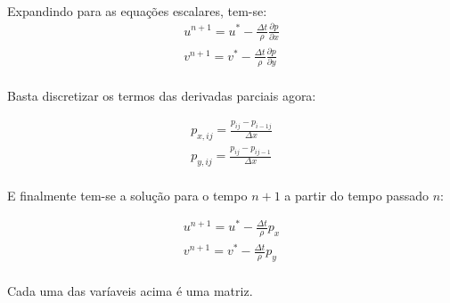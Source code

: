 \documentclass[a4paper,11pt]{article}
\begin{document}
\paragraph{} Expandindo para as equações escalares, tem-se:
\begin{eqnarray}
u^{n+1}=u^*-\frac{\Delta t}{\rho}\frac{\partial p}{\partial x}\\
v^{n+1}=v^*-\frac{\Delta t}{\rho}\frac{\partial p}{\partial y}
\end{eqnarray}
\paragraph{} Basta discretizar os termos das derivadas parciais agora:

\begin{eqnarray}
p_{x,ij}=\frac{p_{ij}-p_{i-1j}}{\Delta x}\\
p_{y,ij}=\frac{p_{ij}-p_{ij-1}}{\Delta x}
\end{eqnarray}

\paragraph{} E finalmente tem-se a solução para o tempo $n+1$ a partir do tempo passado $n$:

\begin{eqnarray}
u^{n+1}=u^*-\frac{\Delta t}{\rho}p_x\\
v^{n+1}=v^*-\frac{\Delta t}{\rho}p_y
\end{eqnarray}
\paragraph{} Cada uma das varíaveis acima é uma matriz.
\end{document}
